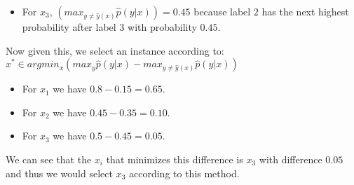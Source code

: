 \documentclass[english]{article}
\begin{document}
\begin{enumerate}
\begin{itemize}
    \item For $x_3$, $(max_{y\neq\hat{y}(x)}\hat{p}(y|x)) = 0.45$ because label $2$ has the next highest probability after label $3$ with probability $0.45$. 
    \end{itemize}
    Now given this, we select an instance according to: $x^* \in argmin_{x} (max_y \hat{p}(y|x) - max_{y\neq\hat{y}(x)}\hat{p}(y|x))$
    \begin{itemize}
    \item For $x_1$ we have $0.8-0.15 = 0.65$. 
    \item For $x_2$ we have $0.45-0.35 = 0.10$.
    \item For $x_3$ we have $0.5-0.45 = 0.05$.
    \end{itemize}
    We can see that the $x_i$ that minimizes this difference is $x_3$ with difference $0.05$ and thus we would select $x_3$ according to this method. 
\end{enumerate}
\end{document}
